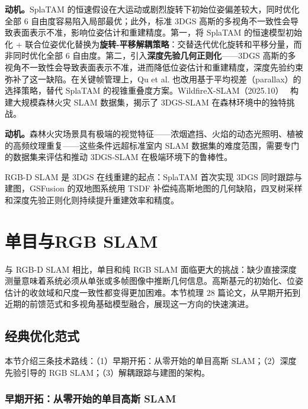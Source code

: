 \textbf{动机。}SplaTAM 的恒速假设在大运动或剧烈旋转下初始位姿偏差较大，同时优化全部 6 自由度容易陷入局部最优；此外，标准 3DGS 高斯的多视角不一致性会导致表面表示不准，影响位姿估计和重建精度。第一，将 SplaTAM 的恒速模型初始化 + 联合位姿优化替换为\textbf{旋转-平移解耦策略}：交替迭代优化旋转和平移分量，而非同时优化全部 6 自由度。第二，引入\textbf{深度先验几何正则化}——3DGS 高斯的多视角不一致性会导致表面表示不准，进而降低位姿估计和重建精度，深度先验约束弥补了这一缺陷。在关键帧管理上，Qu et al. 也改用基于平均视差（parallax）的选择策略，替代 SplaTAM 的视锥重叠度方案。WildfireX-SLAM（2025.10）~\cite{2510_27133} 构建大规模森林火灾 SLAM 数据集，揭示了 3DGS-SLAM 在森林环境中的独特挑战。

\textbf{动机。}森林火灾场景具有极端的视觉特征——浓烟遮挡、火焰的动态光照明、植被的高频纹理重复——这些条件远超标准室内 SLAM 数据集的难度范围，需要专门的数据集来评估和推动 3DGS-SLAM 在极端环境下的鲁棒性。

\begin{takeaway}
RGB-D SLAM 是 3DGS 在线重建的起点：SplaTAM 首次实现 3DGS 同时跟踪与建图，GSFusion 的双地图系统用 TSDF 补偿纯高斯地图的几何缺陷，四叉树采样和深度先验正则化则持续提升重建效率和精度。
\end{takeaway}



\section{单目与RGB SLAM}
\label{sec:15_2}

与 RGB-D SLAM 相比，单目和纯 RGB SLAM 面临更大的挑战：缺少直接深度测量意味着系统必须从单张或多帧图像中推断几何信息。高斯基元的初始化、位姿估计的收敛域和尺度一致性都变得更加困难。本节梳理 28 篇论文，从早期开拓到近期的前馈范式和多视角基础模型融合，展现这一方向的快速演进。

\subsection{经典优化范式}

本节介绍三条技术路线：（1）早期开拓：从零开始的单目高斯 SLAM；（2）深度先验引导的 RGB SLAM；（3）解耦跟踪与建图的架构。

\subsubsection{早期开拓：从零开始的单目高斯 SLAM}

